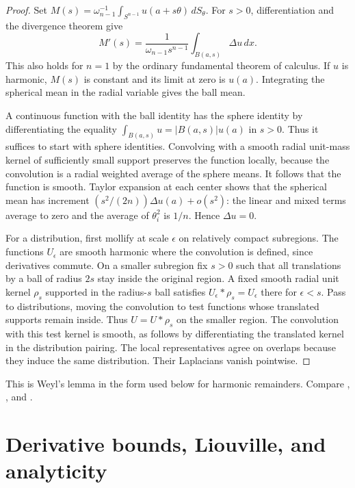 \documentclass[11pt,oneside,openany]{book}
\theoremstyle{plain}
\theoremstyle{definition}
\theoremstyle{remark}
\begin{document}
\begin{proof}
Set \(M(s)=\omega_{n-1}^{-1}\int_{S^{n-1}}u(a+s\theta)\,dS_\theta\).
For \(s>0\), differentiation and the divergence theorem give
\[
 M'(s)=\frac{1}{\omega_{n-1}s^{n-1}}
                 \int_{B(a,s)}\Delta u\,dx .
\]
This also holds for \(n=1\) by the ordinary fundamental theorem of
calculus. If \(u\) is harmonic, \(M(s)\) is constant and its
limit at zero is \(u(a)\). Integrating the spherical mean in
the radial variable gives the ball mean.

A continuous function with the ball identity has the sphere
identity by differentiating the equality
\(\int_{B(a,s)}u=|B(a,s)|u(a)\) in \(s>0\). Thus it suffices to
start with sphere identities. Convolving with a smooth
radial unit-mass kernel of sufficiently small support preserves
the function locally, because the convolution is a radial
weighted average of the sphere means. It follows that the function
is smooth. Taylor expansion at each center shows that the
spherical mean has increment
\((s^2/(2n))\Delta u(a)+o(s^2)\): the linear and mixed
terms average to zero and the average of \(\theta_i^2\) is \(1/n\).
Hence \(\Delta u=0\).

For a distribution, first mollify at scale \(\epsilon\) on
relatively compact subregions. The functions \(U_\epsilon\)
are smooth harmonic where the convolution is defined, since
derivatives commute. On a smaller subregion fix \(s>0\) such
that all translations by a ball of radius \(2s\) stay inside
the original region. A fixed smooth radial unit kernel \(\rho_s\)
supported in the radius-\(s\) ball satisfies
\(U_\epsilon*\rho_s=U_\epsilon\) there for \(\epsilon<s\).
Pass to distributions, moving the convolution to test functions
whose translated supports remain inside. Thus \(U=U*\rho_s\)
on the smaller region. The convolution with this test kernel
is smooth, as follows by differentiating the translated kernel
in the distribution pairing. The local representatives agree on
overlaps because they induce the same distribution. Their
Laplacians vanish pointwise.
\end{proof}

This is Weyl's lemma in the form used below for harmonic remainders.
Compare \cite[Sections 1.2--1.3]{AG}, \cite[Sections 2.2 and 2.7]{GT},
and \cite[Section 2.2]{Evans}.

\section{Derivative bounds, Liouville, and analyticity}
\label{pde:L03}
\end{document}
